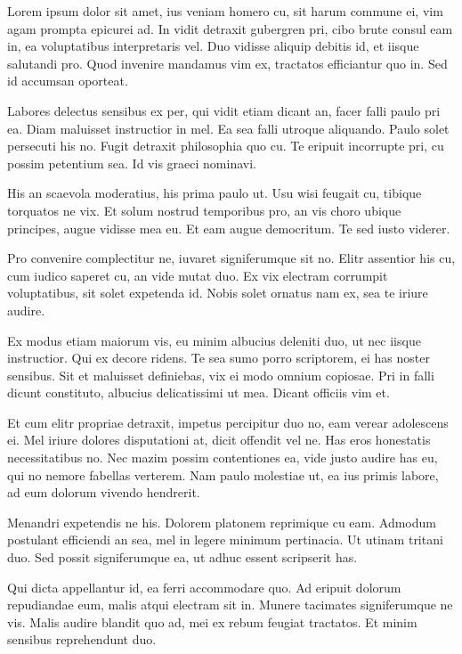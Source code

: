 Lorem ipsum dolor sit amet, ius veniam homero cu, sit harum commune ei, vim agam prompta epicurei ad. In vidit detraxit gubergren pri, cibo brute consul eam in, ea voluptatibus interpretaris vel. Duo vidisse aliquip debitis id, et iisque salutandi pro. Quod invenire mandamus vim ex, tractatos efficiantur quo in. Sed id accumsan oporteat.

Labores delectus sensibus ex per, qui vidit etiam dicant an, facer falli paulo pri ea. Diam maluisset instructior in mel. Ea sea falli utroque aliquando. Paulo solet persecuti his no. Fugit detraxit philosophia quo cu. Te eripuit incorrupte pri, cu possim petentium sea. Id vis graeci nominavi.

His an scaevola moderatius, his prima paulo ut. Usu wisi feugait cu, tibique torquatos ne vix. Et solum nostrud temporibus pro, an vis choro ubique principes, augue vidisse mea eu. Et eam augue democritum. Te sed iusto viderer.

Pro convenire complectitur ne, iuvaret signiferumque sit no. Elitr assentior his cu, cum iudico saperet cu, an vide mutat duo. Ex vix electram corrumpit voluptatibus, sit solet expetenda id. Nobis solet ornatus nam ex, sea te iriure audire.

Ex modus etiam maiorum vis, eu minim albucius deleniti duo, ut nec iisque instructior. Qui ex decore ridens. Te sea sumo porro scriptorem, ei has noster sensibus. Sit et maluisset definiebas, vix ei modo omnium copiosae. Pri in falli dicunt constituto, albucius delicatissimi ut mea. Dicant officiis vim et.

Et cum elitr propriae detraxit, impetus percipitur duo no, eam verear adolescens ei. Mel iriure dolores disputationi at, dicit offendit vel ne. Has eros honestatis necessitatibus no. Nec mazim possim contentiones ea, vide justo audire has eu, qui no nemore fabellas verterem. Nam paulo molestiae ut, ea ius primis labore, ad eum dolorum vivendo hendrerit.

Menandri expetendis ne his. Dolorem platonem reprimique cu eam. Admodum postulant efficiendi an sea, mel in legere minimum pertinacia. Ut utinam tritani duo. Sed possit signiferumque ea, ut adhuc essent scripserit has.

Qui dicta appellantur id, ea ferri accommodare quo. Ad eripuit dolorum repudiandae eum, malis atqui electram sit in. Munere tacimates signiferumque ne vis. Malis audire blandit quo ad, mei ex rebum feugiat tractatos. Et minim sensibus reprehendunt duo.
